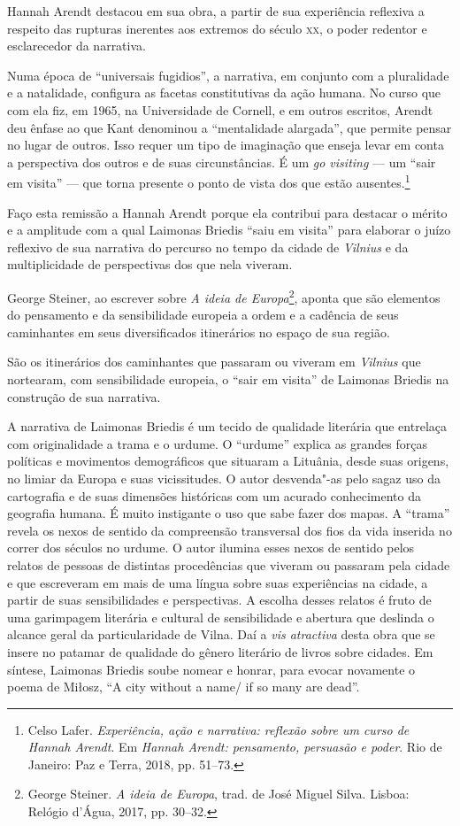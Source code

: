 Hannah Arendt destacou em sua obra, a partir de sua experiência
reflexiva a respeito das rupturas inerentes aos extremos do século \textsc{xx}, o
poder redentor e esclarecedor da narrativa.

Numa época de ``universais fugidios'', a narrativa, em conjunto com a
pluralidade e a natalidade, configura as facetas constitutivas da ação
humana. No curso que com ela fiz, em 1965, na Universidade de Cornell, e
em outros escritos, Arendt deu ênfase ao que Kant denominou a
``mentalidade alargada'', que permite pensar no lugar de outros. Isso
requer um tipo de imaginação que enseja levar em conta a perspectiva dos
outros e de suas circunstâncias. É um \textit{go visiting} --- um ``sair em
visita'' --- que torna presente o ponto de vista dos que estão
ausentes.\footnote{Celso Lafer. \textit{Experiência, ação e narrativa:
  reflexão sobre um curso de Hannah Arendt}. Em \textit{Hannah Arendt:
  pensamento, persuasão e poder}. Rio de Janeiro:
  Paz e Terra, 2018, pp. 51--73.}

Faço esta remissão a Hannah Arendt porque ela contribui para destacar o
mérito e a amplitude com a qual Laimonas Briedis ``saiu em visita'' para
elaborar o juízo reflexivo de sua narrativa do percurso no tempo da
cidade de \textit{Vilnius} e da multiplicidade de perspectivas dos que nela
viveram.

George Steiner, ao escrever sobre \textit{A ideia de Europa}\footnote{George Steiner. 
\textit{A ideia de Europa}, trad. de José Miguel Silva. Lisboa: Relógio d'Água, 
2017, pp. 30--32.}, aponta que
são elementos do pensamento e da sensibilidade europeia a ordem e a
cadência de seus caminhantes em seus diversificados itinerários no
espaço de sua região.

São os itinerários dos caminhantes que passaram ou viveram em \textit{Vilnius}
que nortearam, com sensibilidade europeia, o ``sair em visita'' de
Laimonas Briedis na construção de sua narrativa.

A narrativa de Laimonas Briedis é um tecido de qualidade literária que
entrelaça com originalidade a trama e o urdume. O ``urdume'' explica as
grandes forças políticas e movimentos demográficos que situaram a
Lituânia, desde suas origens, no limiar da Europa e suas vicissitudes. O
autor desvenda"-as pelo sagaz uso da cartografia e de suas dimensões
históricas com um acurado conhecimento da geografia humana. É muito
instigante o uso que sabe fazer dos mapas. A ``trama'' revela os nexos de
sentido da compreensão transversal dos fios da vida inserida no correr
dos séculos no urdume. O autor ilumina esses nexos de sentido pelos
relatos de pessoas de distintas procedências que viveram ou passaram
pela cidade e que escreveram em mais de uma língua sobre suas
experiências na cidade, a partir de suas sensibilidades e perspectivas.
A escolha desses relatos é fruto de uma garimpagem literária e cultural
de sensibilidade e abertura que deslinda o alcance geral da
particularidade de Vilna. Daí a \textit{vis atractiva} desta obra que se
insere no patamar de qualidade do gênero literário de livros sobre
cidades. Em síntese, Laimonas Briedis soube nomear e honrar, para evocar
novamente o poema de Miłosz, ``A city without a name/ if so many are
dead''.

